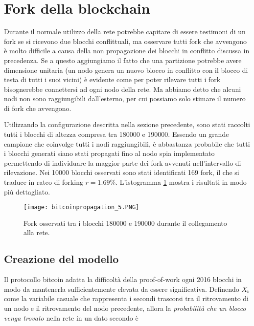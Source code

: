 \section{Fork della blockchain}\label{fork-della-blockchain}

Durante il normale utilizzo della rete potrebbe capitare di essere testimoni di un fork se si ricevono due blocchi conflittuali, ma osservare tutti fork che avvengono è molto difficile a causa della non propagazione dei blocchi in conflitto discussa in precedenza. Se a questo aggiungiamo il fatto che una partizione potrebbe avere dimensione unitaria (un nodo genera un nuovo blocco in conflitto con il blocco di testa di tutti i suoi vicini) è evidente come per poter rilevare tutti i fork bisognerebbe connettersi ad ogni nodo della rete. Ma abbiamo detto che alcuni nodi non sono raggiungibili dall'esterno, per cui possiamo solo stimare il numero di fork che avvengono.

Utilizzando la configurazione descritta nella sezione precedente, sono stati raccolti tutti i blocchi di altezza compresa tra 180000 e 190000. Essendo un grande campione che coinvolge tutti i nodi raggiungibili, è abbastanza probabile che tutti i blocchi generati siano stati propagati fino al nodo spia implementato permettendo di individuare la maggior parte dei fork avvenuti nell'intervallo di rilevazione. Nei 10000 blocchi osservati sono stati identificati 169 fork, il che si traduce in rateo di forking $r = 1.69\%$. L'istogramma \ref{bitcoinpropagation_5} mostra i risultati in modo più dettagliato.

\begin{figure}[htbp]
\centering
\texttt{[image: bitcoinpropagation\_5.PNG]}
\caption{Fork osservati tra i blocchi 180000 e 190000 durante il collegamento alla rete.\label{bitcoinpropagation_5}}
\end{figure}

\subsection{Creazione del modello}\label{creazione-del-modello}

Il protocollo bitcoin adatta la difficoltà della proof-of-work ogni 2016 blocchi in modo da mantenerla sufficientemente elevata da essere significativa. Definendo $X_b$ come la variabile casuale che rappresenta i secondi trascorsi tra il ritrovamento di un nodo e il ritrovamento del nodo precedente, allora la \emph{probabilità che un blocco venga trovato} nella rete in un dato secondo è


